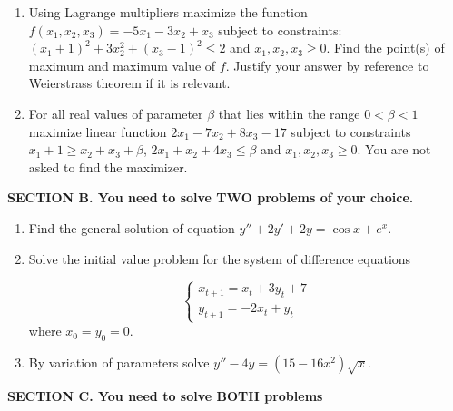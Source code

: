 \documentclass[12pt,a4paper]{article}
\begin{document}
\begin{enumerate}

\item Using Lagrange multipliers maximize the function $f(x_1,x_2,x_3)=-5x_1-3x_2+x_3$ subject to constraints:   $(x_1+1)^2+3x_2^2+(x_3-1)^2\leq 2$ and $x_1, x_2, x_3 \geq 0$. Find the point(s) of maximum and maximum value of $f$. Justify your answer by reference to Weierstrass theorem if it is relevant.

\item For all real values of parameter $\beta$ that lies within the range $0<\beta<1$ maximize linear function $2x_1-7x_2+8x_3-17$ subject to constraints  $x_1+1\geq x_2+x_3+\beta$,  $2x_1+x_2+4x_3\leq \beta$ and $x_1, x_2, x_3 \geq 0$. You are not asked to find the maximizer.

\end{enumerate}


\textbf{SECTION B. You need to solve TWO problems of your choice. }

\begin{enumerate}[resume]

\item Find the general solution of equation $y''+2y'+2y=\cos x + e^{x}$.

\item Solve the initial value problem for the system of difference equations

\[
\begin{cases}
x_{t+1}=x_t+3y_t+7 \\
y_{t+1}=-2x_t+y_t
\end{cases}
\]
where $x_0=y_0=0$.

\item By variation of parameters solve $y''-4y=(15-16x^2)\sqrt{x}$.

\end{enumerate}

\textbf{SECTION C. You need to solve BOTH problems }
\end{document}
